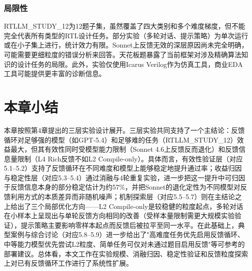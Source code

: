 \subsubsection*{局限性}
RTLLM\_STUDY\_12为12题子集，虽然覆盖了四大类别和多个难度梯度，但不能完全代表所有类型的RTL设计任务。部分实验（多轮对话、提示策略）为单次运行或在小子集上进行，统计效力有限。Sonnet上反馈无效的深层原因尚未完全明确，可能需要更细粒度的错误分析来回答。天花板题暴露了当前框架对涉及精确算法知识的设计任务的局限。此外，实验仅使用Icarus Verilog作为仿真工具，商业EDA工具可能提供更丰富的诊断信息。

\section{本章小结}

本章按照第4章提出的三层实验设计展开。三层实验共同支持了一个主结论：反馈循环对足够强的模型（如GPT-5.4）和足够难的任务（RTLLM\_STUDY\_12）效益最大，但其有效性同时受模型能力限制（Sonnet 4.6上反馈反而退化）和反馈信息量限制（L4 Rich反馈不如L2 Compile-only）。具体而言，有效性验证层（对应5.1--5.2）支持了反馈循环在不同难度和模型上能够稳定地提升通过率；收益归因与稳定性层（对应5.3--5.4）通过消融与4轮重复实验，进一步把这一提升中可归因于反馈信息本身的部分稳定估计为约57\%，并把Sonnet的退化定性为不同模型对反馈利用方式的本质差异而非随机噪声；机制探索层（对应5.5--5.7）则在主结论之上给出了三个局部优化方向——L2 Compile-only是较稳健的粒度起点，多轮对话在小样本上呈现出与单轮反馈方向相同的改善（受样本量限制需更大规模实验验证），提示策略主要影响零样本起点而反馈后被拉平至同一水平。在此基础上，典型案例与综合讨论（对应5.8--5.9）进一步给出了"高难度任务优先启用反馈循环、中等能力模型优先尝试L2粒度、简单任务可仅对未通过题目启用反馈"等可参考的部署建议。总体看，本文工作在实验规模、消融归因、稳定性验证和反馈粒度探索上对已有反馈循环工作进行了系统性扩展。

